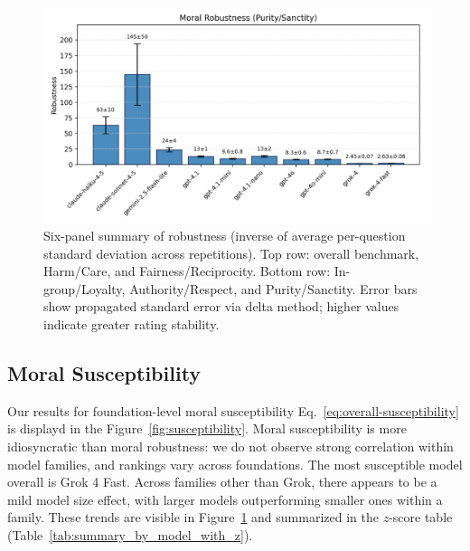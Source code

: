 \documentclass{article}
\begin{document}
\begin{figure}[!t]
  \includegraphics[width=0.3\linewidth]{../results/robustness_purity_sanctity.png}
  \caption{Six-panel summary of robustness (inverse of average per-question standard deviation across repetitions). Top row: overall benchmark, Harm/Care, and Fairness/Reciprocity. Bottom row: In-group/Loyalty, Authority/Respect, and Purity/Sanctity. Error bars show propagated standard error via delta method; higher values indicate greater rating stability.}
  \label{fig:robustness}
\end{figure}

\subsection{Moral Susceptibility}

Our results for foundation-level moral susceptibility Eq.~\eqref{eq:overall-susceptibility} is displayd in the Figure~\ref{fig:susceptibility}. Moral susceptibility is more idiosyncratic than moral robustness: we do not observe strong correlation within model families, and rankings vary across foundations. The most susceptible model overall is Grok 4 Fast. Across families other than Grok, there appears to be a mild model size effect, with larger models outperforming smaller ones within a family. These trends are visible in Figure~\ref{fig:robustness} and summarized in the $z$-score table (Table~\ref{tab:summary_by_model_with_z}).
\end{document}
